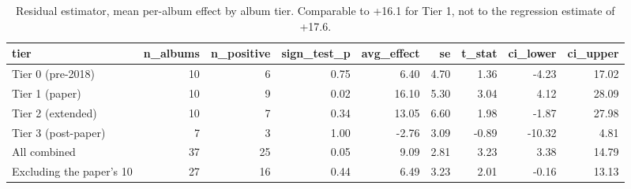 \begin{table}
\caption{Residual estimator, mean per-album effect by album tier. Comparable to +16.1 for Tier 1, not to the regression estimate of +17.6.}
\begin{tabular}{lrrrrrrrr}
\toprule
tier & n\_albums & n\_positive & sign\_test\_p & avg\_effect & se & t\_stat & ci\_lower & ci\_upper \\
\midrule
Tier 0 (pre-2018) & 10 & 6 & 0.75 & 6.40 & 4.70 & 1.36 & -4.23 & 17.02 \\
Tier 1 (paper) & 10 & 9 & 0.02 & 16.10 & 5.30 & 3.04 & 4.12 & 28.09 \\
Tier 2 (extended) & 10 & 7 & 0.34 & 13.05 & 6.60 & 1.98 & -1.87 & 27.98 \\
Tier 3 (post-paper) & 7 & 3 & 1.00 & -2.76 & 3.09 & -0.89 & -10.32 & 4.81 \\
All combined & 37 & 25 & 0.05 & 9.09 & 2.81 & 3.23 & 3.38 & 14.79 \\
Excluding the paper's 10 & 27 & 16 & 0.44 & 6.49 & 3.23 & 2.01 & -0.16 & 13.13 \\
\bottomrule
\end{tabular}
\end{table}
